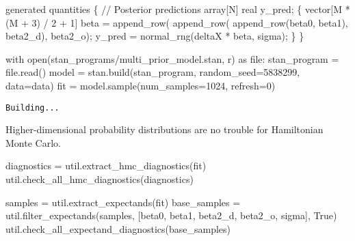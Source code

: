 \documentclass[
  letterpaper,
  DIV=11,
  numbers=noendperiod]{scrartcl}
\newenvironment{Shaded}{\begin{snugshade}}{\end{snugshade}}
\newcommand{\BuiltInTok}[1]{\textcolor[rgb]{0.00,0.23,0.31}{#1}}
\newcommand{\CommentTok}[1]{\textcolor[rgb]{0.37,0.37,0.37}{#1}}
\newcommand{\ControlFlowTok}[1]{\textcolor[rgb]{0.00,0.23,0.31}{#1}}
\newcommand{\DataTypeTok}[1]{\textcolor[rgb]{0.68,0.00,0.00}{#1}}
\newcommand{\DecValTok}[1]{\textcolor[rgb]{0.68,0.00,0.00}{#1}}
\newcommand{\ImportTok}[1]{\textcolor[rgb]{0.00,0.46,0.62}{#1}}
\newcommand{\KeywordTok}[1]{\textcolor[rgb]{0.00,0.23,0.31}{#1}}
\newcommand{\NormalTok}[1]{\textcolor[rgb]{0.00,0.23,0.31}{#1}}
\newcommand{\OperatorTok}[1]{\textcolor[rgb]{0.37,0.37,0.37}{#1}}
\newcommand{\StringTok}[1]{\textcolor[rgb]{0.13,0.47,0.30}{#1}}
\newcommand{\VariableTok}[1]{\textcolor[rgb]{0.07,0.07,0.07}{#1}}
\begin{document}
\begin{codelisting}
\begin{Shaded}
\begin{Highlighting}[]
\KeywordTok{generated quantities}\NormalTok{ \{}
  \CommentTok{// Posterior predictions}
  \DataTypeTok{array}\NormalTok{[N] }\DataTypeTok{real}\NormalTok{ y\_pred;}
\NormalTok{  \{}
    \DataTypeTok{vector}\NormalTok{[M * (M + }\DecValTok{3}\NormalTok{) / }\DecValTok{2}\NormalTok{ + }\DecValTok{1}\NormalTok{] beta}
\NormalTok{      = append\_row(}
\NormalTok{          append\_row(}
\NormalTok{            append\_row(beta0, beta1), }
\NormalTok{          beta2\_d),}
\NormalTok{        beta2\_o);}
\NormalTok{    y\_pred = normal\_rng(deltaX * beta, sigma);}
\NormalTok{  \}}
\NormalTok{\}}
\end{Highlighting}
\end{Shaded}

\end{codelisting}

\begin{Shaded}
\begin{Highlighting}[]
\ControlFlowTok{with} \BuiltInTok{open}\NormalTok{(}\StringTok{\textquotesingle{}stan\_programs/multi\_prior\_model.stan\textquotesingle{}}\NormalTok{, }\StringTok{\textquotesingle{}r\textquotesingle{}}\NormalTok{) }\ImportTok{as} \BuiltInTok{file}\NormalTok{:}
\NormalTok{  stan\_program }\OperatorTok{=} \BuiltInTok{file}\NormalTok{.read()}
\NormalTok{model }\OperatorTok{=}\NormalTok{ stan.build(stan\_program, random\_seed}\OperatorTok{=}\DecValTok{5838299}\NormalTok{, data}\OperatorTok{=}\NormalTok{data)}
\NormalTok{fit }\OperatorTok{=}\NormalTok{ model.sample(num\_samples}\OperatorTok{=}\DecValTok{1024}\NormalTok{, refresh}\OperatorTok{=}\DecValTok{0}\NormalTok{)}
\end{Highlighting}
\end{Shaded}

\begin{verbatim}
Building...
\end{verbatim}

Higher-dimensional probability distributions are no trouble for
Hamiltonian Monte Carlo.

\begin{Shaded}
\begin{Highlighting}[]
\NormalTok{diagnostics }\OperatorTok{=}\NormalTok{ util.extract\_hmc\_diagnostics(fit)}
\NormalTok{util.check\_all\_hmc\_diagnostics(diagnostics)}

\NormalTok{samples }\OperatorTok{=}\NormalTok{ util.extract\_expectands(fit)}
\NormalTok{base\_samples }\OperatorTok{=}\NormalTok{ util.filter\_expectands(samples,}
\NormalTok{                                      [}\StringTok{\textquotesingle{}beta0\textquotesingle{}}\NormalTok{, }\StringTok{\textquotesingle{}beta1\textquotesingle{}}\NormalTok{,}
                                       \StringTok{\textquotesingle{}beta2\_d\textquotesingle{}}\NormalTok{, }\StringTok{\textquotesingle{}beta2\_o\textquotesingle{}}\NormalTok{,}
                                       \StringTok{\textquotesingle{}sigma\textquotesingle{}}\NormalTok{],}
                                      \VariableTok{True}\NormalTok{)}
\NormalTok{util.check\_all\_expectand\_diagnostics(base\_samples)}
\end{Highlighting}
\end{Shaded}
\end{document}
